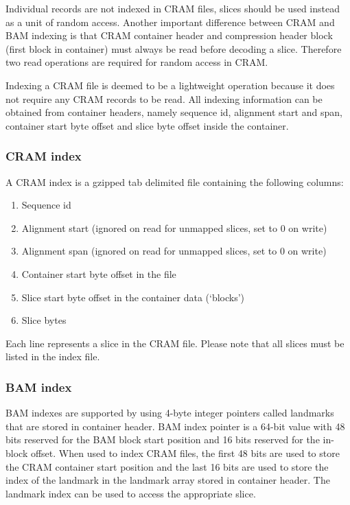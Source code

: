 \documentclass[a4paper]{article}
\begin{document}
Individual records are not indexed in CRAM files, slices should be used instead 
as a unit of random access. Another important difference between CRAM and BAM indexing 
is that CRAM container header and compression header block (first block in container) 
must always be read before decoding a slice. Therefore two read operations are 
required for random access in CRAM.

Indexing a CRAM file is deemed to be a lightweight operation because it does not 
require any CRAM records to be read. All indexing information can be obtained from 
container headers, namely sequence id, alignment start and span, container start 
byte offset and slice byte offset inside the container. 

\subsubsection*{CRAM index}

A CRAM index is a gzipped tab delimited file containing the following columns:

\begin{enumerate}
\item Sequence id

\item Alignment start (ignored on read for unmapped slices, set to 0 on write)

\item Alignment span (ignored on read for unmapped slices, set to 0 on write)

\item Container start byte offset in the file

\item Slice start byte offset in the container data (`blocks')

\item Slice bytes
\end{enumerate}

Each line represents a slice in the CRAM file. Please note that all slices must 
be listed in the index file.

\subsubsection*{BAM index}

BAM indexes are supported by using 4-byte integer pointers called landmarks that 
are stored in container header. BAM index pointer is a 64-bit value with 48 bits 
reserved for the BAM block start position and 16 bits reserved for the in-block 
offset. When used to index CRAM files, the first 48 bits are used to store the 
CRAM container start position and the last 16 bits are used to store the index 
of the landmark in the landmark array stored in  container header. The landmark 
index can be used to access the appropriate slice. 
\end{document}
